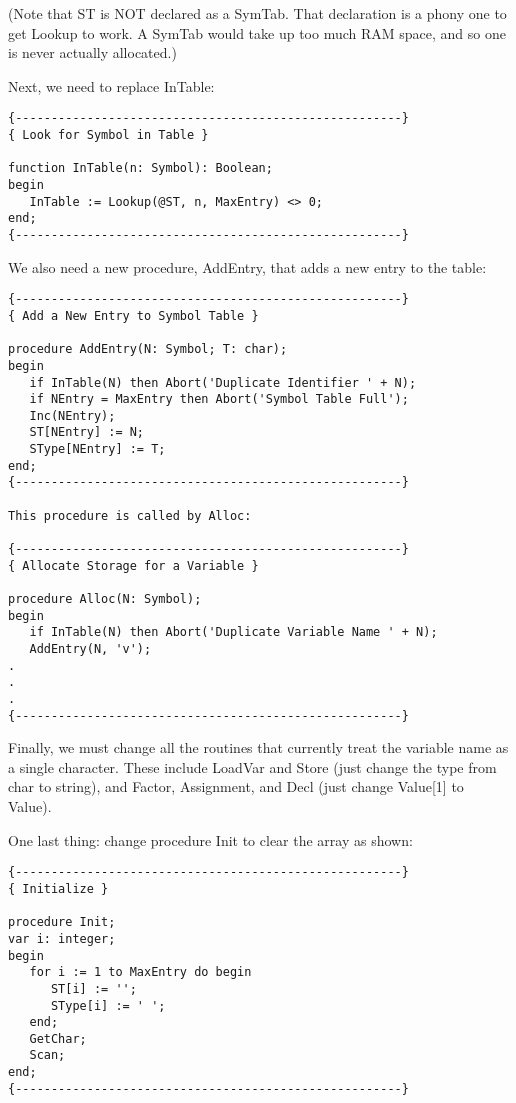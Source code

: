 (Note that ST is  NOT  declared as a SymTab. That declaration is a phony one to get Lookup to work. A SymTab  would  take  up too much RAM space, and so one is never actually allocated.)

Next, we need to replace InTable:

\begin{verbatim}
{------------------------------------------------------}
{ Look for Symbol in Table }

function InTable(n: Symbol): Boolean;
begin
   InTable := Lookup(@ST, n, MaxEntry) <> 0;
end;
{------------------------------------------------------}
\end{verbatim}

We also need a new procedure, AddEntry, that adds a new  entry to the table:

\begin{verbatim}
{------------------------------------------------------}
{ Add a New Entry to Symbol Table }

procedure AddEntry(N: Symbol; T: char);
begin
   if InTable(N) then Abort('Duplicate Identifier ' + N);
   if NEntry = MaxEntry then Abort('Symbol Table Full');
   Inc(NEntry);
   ST[NEntry] := N;
   SType[NEntry] := T;
end;
{------------------------------------------------------}

This procedure is called by Alloc:

{------------------------------------------------------}
{ Allocate Storage for a Variable }

procedure Alloc(N: Symbol);
begin
   if InTable(N) then Abort('Duplicate Variable Name ' + N);
   AddEntry(N, 'v');
.
.
.
{------------------------------------------------------}
\end{verbatim}

Finally, we must change all the routines that currently treat the variable name as a single character. These include   LoadVar and Store (just change the  type  from  char  to string), and Factor, Assignment, and Decl (just change Value[1] to Value).

One  last  thing:  change  procedure  Init to clear the array  as shown:

\begin{verbatim}
{------------------------------------------------------}
{ Initialize }

procedure Init;
var i: integer;
begin
   for i := 1 to MaxEntry do begin
      ST[i] := '';
      SType[i] := ' ';
   end;
   GetChar;
   Scan;
end;
{------------------------------------------------------}
\end{verbatim}

